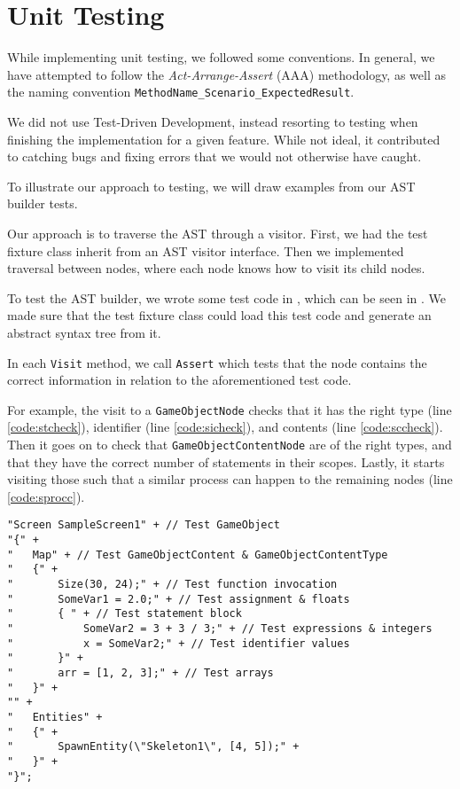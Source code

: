 \section{Unit Testing}
While implementing unit testing, we followed some conventions.
In general, we have attempted to follow the \textit{Act-Arrange-Assert} (AAA)
methodology, as well as the naming convention 
\texttt{MethodName\_Scenario\_ExpectedResult}.

We did not use Test-Driven Development, instead resorting to testing
when finishing the implementation for a given feature. While not ideal, it
contributed to catching bugs and fixing errors that we would not
otherwise have caught.

To illustrate our approach to testing, we will draw examples from our
AST builder tests.

Our approach is to traverse the AST through a visitor. First,
we had the test fixture class inherit from an AST visitor interface.
Then we implemented traversal between nodes, where each node knows how
to visit its child nodes.

To test the AST builder, we wrote some test code in \dazel{}, which can be seen in . We made sure that
the test fixture class could load this test code and generate an abstract syntax tree from it.

In each \texttt{Visit} method, we call \texttt{Assert} which tests
that the node contains the correct information in relation to the
aforementioned \dazel{} test code.

For example, the visit to a \texttt{GameObjectNode} checks that it has the
right type (line \ref{code:stcheck}), identifier (line \ref{code:sicheck}), and contents (line \ref{code:sccheck}). Then it goes on to check that
\texttt{GameObjectContentNode} are of the right types, and that they have
the correct number of statements in their scopes. Lastly, it starts visiting
those such that a similar process can happen to the remaining nodes (line \ref{code:sprocc}).

\begin{lstlisting}[language=CSharp, caption={AST Builder \dazel{} test code.}, label={lst:asttestcode}]
"Screen SampleScreen1" + // Test GameObject
"{" +
"   Map" + // Test GameObjectContent & GameObjectContentType
"   {" +
"       Size(30, 24);" + // Test function invocation
"       SomeVar1 = 2.0;" + // Test assignment & floats
"       { " + // Test statement block
"           SomeVar2 = 3 + 3 / 3;" + // Test expressions & integers
"           x = SomeVar2;" + // Test identifier values
"       }" +
"       arr = [1, 2, 3];" + // Test arrays
"   }" +
"" +
"   Entities" +
"   {" +
"       SpawnEntity(\"Skeleton1\", [4, 5]);" +
"   }" +
"}";
\end{lstlisting}


